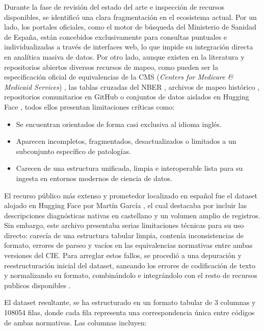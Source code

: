 \documentclass[12pt,a4paper,onecolumn,oneside]{report}
\begin{document}
Durante la fase de revisión del estado del arte e inspección de recursos disponibles, se identificó una clara fragmentación en el ecosistema actual. Por un lado, los portales oficiales, como el motor de búsqueda del Ministerio de Sanidad de España, están concebidos exclusivamente para consultas puntuales e individualizadas a través de interfaces web, lo que impide su integración directa en analítica masiva de datos. Por otro lado, aunque existen en la literatura y repositorios abiertos diversos recursos de mapeo, como pueden ser la especificación oficial de equivalencias de la CMS (\textit{Centers for Medicare \& Medicaid Services}) \cite{cms_icd10_codes}, las tablas cruzadas del NBER \cite{nber_icd_crosswalk}, archivos de mapeo histórico \cite{nzhis_mapping}, repositorios comunitarios en GitHub \cite{clark_icd9to10, bhanratt_icd9to10, atlas_cumc_conversion} o conjuntos de datos aislados en Hugging Face \cite{huggingface_cie10}, todos ellos presentan limitaciones críticas como:

\begin{itemize}
    \item Se encuentran orientados de forma casi exclusiva al idioma inglés.
    \item Aparecen incompletos, fragmentados, desactualizados o limitados a un subconjunto específico de patologías.
    \item Carecen de una estructura unificada, limpia e interoperable lista para su ingesta en entornos modernos de ciencia de datos.
\end{itemize}

El recurso público más extenso y prometedor localizado en español fue el dataset alojado en Hugging Face por Martín García \cite{huggingface_cie10}, el cual destacaba por incluir las descripciones diagnósticas nativas en castellano y un volumen amplio de registros. Sin embargo, este archivo presentaba serias limitaciones técnicas para su uso directo: carecía de una estructura tabular limpia, contenía inconsistencias de formato, errores de parseo y vacíos en las equivalencias normativas entre ambas versiones del CIE. Para arreglar estos fallos, se procedió a una depuración y reestructuración inicial del dataset, saneando los errores de codificación de texto y normalizando su formato, combinándolo e integrándolo con el resto de recursos publicos disponibles \cite{nber_icd_crosswalk, cms_icd10_codes, clark_icd9to10, bhanratt_icd9to10, atlas_cumc_conversion, nzhis_mapping}.

El dataset resultante, se ha estructurado en un formato tabular de 3 columnas y 108054 filas, donde cada fila representa una correspondencia única entre códigos de ambas normativas. Las columnas incluyen:
\end{document}
